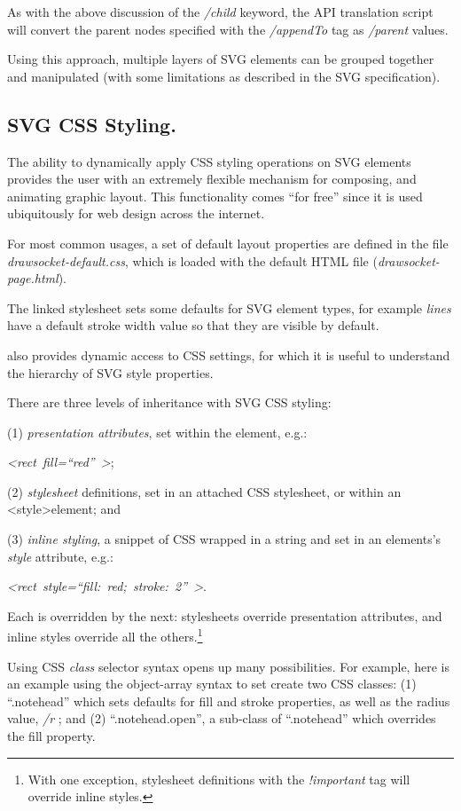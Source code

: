 As with the above discussion of the \textit{/child} keyword, the API translation script will convert the parent nodes specified with the \textit{/appendTo} tag as \textit{/parent} values.

Using this approach, multiple layers of SVG elements can be grouped together and manipulated (with some limitations as described in the SVG specification).

\subsection{SVG CSS Styling.} 
The ability to dynamically apply CSS styling operations on SVG elements provides the user with an extremely flexible mechanism for composing, and animating graphic layout.
This functionality comes ``for free'' since it is used ubiquitously for web design across the internet.

For most common \drawsocket usages, a set of default layout properties are defined in the file \textit{drawsocket-default.css}, which is loaded with the default HTML file (\textit{drawsocket-page.html}).

The linked stylesheet sets some defaults for SVG element types, for example \textit{lines} have a default stroke width value so that they are visible by default.

\drawsocket also provides dynamic access to CSS settings, for which it is useful to understand the hierarchy of SVG style properties. 

There are three levels of inheritance with SVG CSS styling: 

(1) \textit{presentation attributes}, set within the element, e.g.:

\textit{\textless rect~fill=``red''~\textgreater}; 

(2) \textit{stylesheet} definitions, set in an attached CSS stylesheet, or within an \textless style\textgreater element;
and

(3) \textit{inline styling}, a snippet of CSS wrapped in a string and set in an elements's \textit{style} attribute, e.g.:

\textit{\textless rect~style=``fill:~red;~stroke:~2''~\textgreater}.

Each is overridden by the next: stylesheets override presentation attributes, and inline styles override all the others.\footnote{With one exception, stylesheet definitions with the \textit{!important} tag will override inline styles.} 

Using CSS \textit{class} selector syntax opens up many possibilities.
For example, here is an example using the object-array syntax to set create two CSS classes: (1) ``.notehead'' which sets defaults for fill and stroke properties, as well as the radius value, \textit{/r} ; and (2) ``.notehead.open'', a sub-class of ``.notehead'' which overrides the fill property. 

